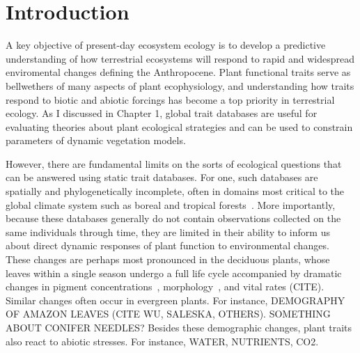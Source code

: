 \section{Introduction}

A key objective of present-day ecosystem ecology is to develop a predictive understanding of how terrestrial ecosystems will respond to rapid and widespread enviromental changes defining the Anthropocene. 
Plant functional traits serve as bellwethers of many aspects of plant ecophysiology, and understanding how traits respond to biotic and abiotic forcings has become a top priority in terrestrial ecology.
% 
% 
As I discussed in Chapter 1, global trait databases are useful for evaluating theories about plant ecological strategies and can be used to constrain parameters of dynamic vegetation models.

However, there are fundamental limits on the sorts of ecological questions that can be answered using static trait databases.
For one, such databases are spatially and phylogenetically incomplete, often in domains most critical to the global climate system such as boreal and tropical forests~\cite{jetz2016_diversity}.
More importantly, because these databases generally do not contain observations collected on the same individuals through time, they are limited in their ability to inform us about direct dynamic responses of plant function to environmental changes.
These changes are perhaps most pronounced in the deciduous plants, whose leaves within a single season undergo a full life cycle accompanied by dramatic changes in pigment concentrations~\cite{yang_2016_seasonal}, morphology~\cite{poorter_2009_causes}, and vital rates (CITE).
% 
% 
Similar changes often occur in evergreen plants.
For instance, DEMOGRAPHY OF AMAZON LEAVES (CITE WU, SALESKA, OTHERS).
SOMETHING ABOUT CONIFER NEEDLES?
Besides these demographic changes, plant traits also react to abiotic stresses.
% 
% 
For instance, WATER, NUTRIENTS, CO2.

